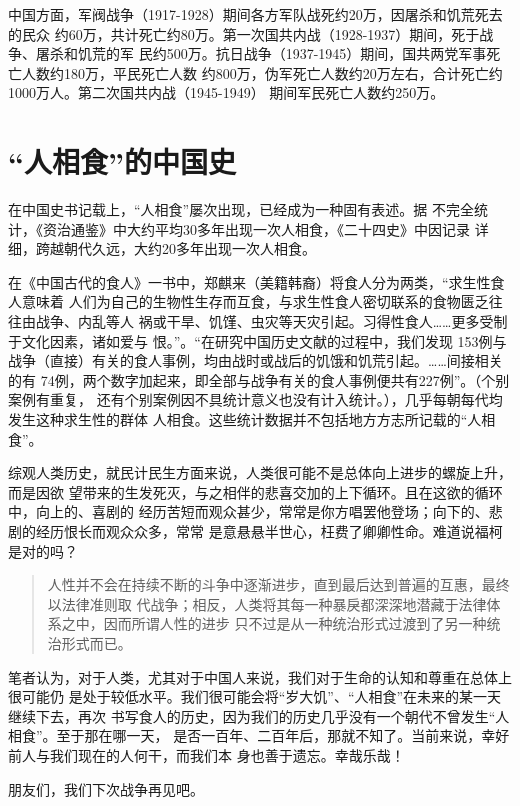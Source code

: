 中国方面，军阀战争（1917-1928）期间各方军队战死约20万，因屠杀和饥荒死去的民众
约60万，共计死亡约80万。第一次国共内战（1928-1937）期间，死于战争、屠杀和饥荒的军
民约500万。抗日战争（1937-1945）期间，国共两党军事死亡人数约180万，平民死亡人数
约800万，伪军死亡人数约20万左右，合计死亡约1000万人。第二次国共内战（1945-1949）
期间军民死亡人数约250万。

\section{“人相食”的中国史}

在中国史书记载上，“人相食”屡次出现，已经成为一种固有表述\cite{renxiangshi}。据
不完全统计，《资治通鉴》中大约平均30多年出现一次人相食，《二十四史》中因记录
详细，跨越朝代久远，大约20多年出现一次人相食。

在《中国古代的食人》一书中，郑麒来（美籍韩裔）将食人分为两类，“求生性食人意味着
人们为自己的生物性生存而互食，与求生性食人密切联系的食物匮乏往往由战争、内乱等人
祸或干旱、饥馑、虫灾等天灾引起。习得性食人……更多受制于文化因素，诸如爱与
恨。”。“在研究中国历史文献的过程中，我们发现
153例与战争（直接）有关的食人事例，均由战时或战后的饥饿和饥荒引起。……间接相关的有
74例，两个数字加起来，即全部与战争有关的食人事例便共有227例”。（个别案例有重复，
还有个别案例因不具统计意义也没有计入统计。），几乎每朝每代均发生这种求生性的群体
人相食。这些统计数据并不包括地方方志所记载的“人相食”。

综观人类历史，就民计民生方面来说，人类很可能不是总体向上进步的螺旋上升，而是因欲
望带来的生发死灭，与之相伴的悲喜交加的上下循环。且在这欲的循环中，向上的、喜剧的
经历苦短而观众甚少，常常是你方唱罢他登场；向下的、悲剧的经历恨长而观众众多，常常
是意悬悬半世心，枉费了卿卿性命。难道说福柯是对的吗？
\begin{quotation}
  人性并不会在持续不断的斗争中逐渐进步，直到最后达到普遍的互惠，最终以法律准则取
  代战争；相反，人类将其每一种暴戾都深深地潜藏于法律体系之中，因而所谓人性的进步
  只不过是从一种统治形式过渡到了另一种统治形式而已。
\end{quotation}


笔者认为，对于人类，尤其对于中国人来说，我们对于生命的认知和尊重在总体上很可能仍
是处于较低水平。我们很可能会将“岁大饥”、“人相食”在未来的某一天继续下去，再次
书写食人的历史，因为我们的历史几乎没有一个朝代不曾发生“人相食”。至于那在哪一天，
是否一百年、二百年后，那就不知了。当前来说，幸好前人与我们现在的人何干，而我们本
身也善于遗忘。幸哉乐哉！\bigskip


朋友们，我们下次战争再见吧。


